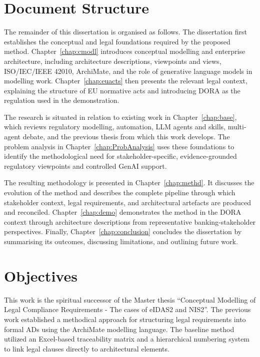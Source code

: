 \section{Document Structure}

The remainder of this dissertation is organised as follows.
The dissertation first establishes the conceptual and legal foundations required by the proposed method. Chapter~\ref{chap:cmodl} introduces conceptual modelling and enterprise architecture, including architecture descriptions, viewpoints and views, ISO/IEC/IEEE 42010, ArchiMate, and the role of generative language models in modelling work. Chapter~\ref{chap:euacts} then presents the relevant legal context, explaining the structure of \ac{EU} normative acts and introducing \ac{DORA} as the regulation used in the demonstration.

The research is situated in relation to existing work in Chapter~\ref{chap:base}, which reviews regulatory modelling, automation, \ac{LLM} agents and skills, multi-agent debate, and the previous thesis from which this work develops. The problem analysis in Chapter~\ref{chap:ProbAnalysis} uses these foundations to identify the methodological need for stakeholder-specific, evidence-grounded regulatory viewpoints and controlled \ac{GenAI} support.

The resulting methodology is presented in Chapter~\ref{chap:methd}. It discusses the evolution of the method and describes the complete pipeline through which stakeholder context, legal requirements, and architectural artefacts are produced and reconciled. Chapter~\ref{chap:demo} demonstrates the method in the \ac{DORA} context through architecture descriptions from representative banking-stakeholder perspectives. Finally, Chapter~\ref{chap:conclusion} concludes the dissertation by summarising its outcomes, discussing limitations, and outlining future work.

\iffalse
\section{Objectives}
This work is the spiritual successor of the Master thesis ``Conceptual Modelling of Legal Compliance Requirements - The cases of \ac{eIDAS2} and \ac{NIS2}''. The previous work established a methodical approach for structuring legal requirements into formal \ac{AD}s using the ArchiMate modelling language. The baseline method utilized an Excel-based traceability matrix and a hierarchical numbering system to link legal clauses directly to architectural elements.

